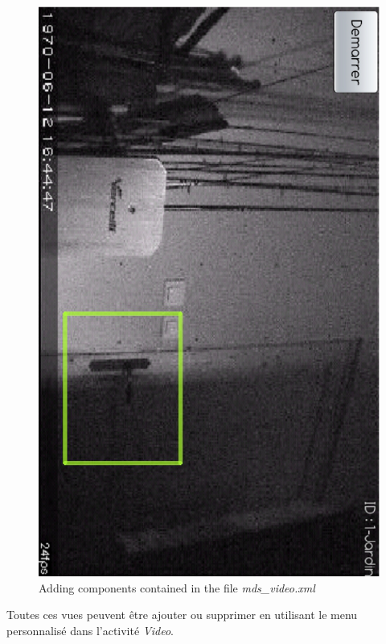 \begin{center}
\begin{figure}[H] 
  \label{videoViewMD}
  \centering
   \includegraphics[angle=90,scale=0.3]{Images/videoViewMD.eps}
  \caption{Adding components contained in the file \textit{mds\_video.xml}}
\end{figure}  
\end{center}

Toutes ces vues peuvent être ajouter ou supprimer en utilisant le menu
personnalisé dans l'activité \textit{Video}.


